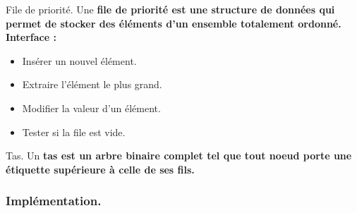 \documentclass[french, 11pt]{article}
\begin{document}
\begin{defi}{File de priorité.}{}
    Une \bf{file de priorité} est une structure de données qui permet de stocker des éléments d'un ensemble totalement ordonné.\\
    Interface :
    \begin{itemize}[topsep=0pt,itemsep=-0.9 ex]
        \item Insérer un nouvel élément.
        \item Extraire l'élément le plus grand.
        \item Modifier la valeur d'un élément.
        \item Tester si la file est vide.
    \end{itemize}
\end{defi}

\begin{defi}{Tas.}{}
    Un \bf{tas} est un arbre binaire complet tel que tout noeud porte une étiquette supérieure à celle de ses fils.
\end{defi}

\subsubsection{Implémentation.}
\end{document}
